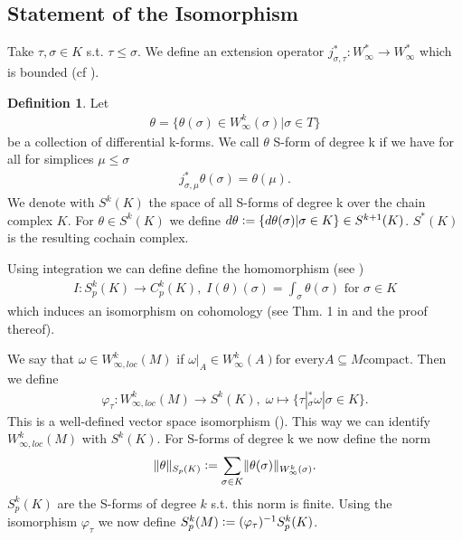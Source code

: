 \documentclass[12pt,a4paper]{article}
\theoremstyle{definition}
\newtheorem{definition}{Definition}
\begin{document}
\subsection{Statement of the Isomorphism}

Take $\tau, \sigma \in K$ s.t. $\tau \leq \sigma$.  We define an extension 
operator $j^*_{\sigma, \tau}:W^*_\infty \rightarrow W^*_\infty $ which is 
bounded (cf \cite[p.191]{goldshtein}). 
\begin{definition}
    Let 
    \begin{align*}
    \theta = \{ \theta(\sigma) \in W^k_\infty(\sigma) | \sigma \in T\}
    \end{align*}
    be a collection of differential k-forms. We call $\theta$ S-form of degree
    k if we have for all for simplices
    $\mu \leq \sigma$ 
    \begin{align*}
    j^*_{\sigma,\mu}\theta(\sigma) = \theta(\mu).
    \end{align*}
    We denote with $S^k(K)$ the space of all S-forms of degree k over the chain
    complex $K$. 
For $\theta \in S^k(K)$ we define $d\theta \vcentcolon= \{ d\theta(\sigma) | 
\sigma \in K \} \in S^{k+1}(K)$. $S^*(K)$ is the resulting cochain complex.
\end{definition}

Using integration we can define define the homomorphism 
(see \cite[p.191]{goldshtein})
\begin{align*}
I: S_p^k(K) \rightarrow C_p^k(K), \; I(\theta)(\sigma) = 
\int_\sigma \theta(\sigma) \text{ for } \sigma \in K
\end{align*}
which induces an isomorphism on cohomology (see Thm. 1 in \cite{goldshtein}
and the proof thereof).

We say that $\omega \in W^k_{\infty,loc}(M)$ 
if $\omega|_A \in W^k_\infty(A) \text{for every} A \subseteq M \text{compact}$.
Then we define 
\begin{align*}
\varphi_\tau: W^k_{\infty,loc}(M) \rightarrow S^k(K), \;
\omega \mapsto \{ \tau|_\sigma^*\omega | \sigma \in K \}.
\end{align*}
This is a well-defined vector space isomorphism (\cite[p.191]{goldshtein}). This
way we can identify $W^k_{\infty,loc}(M)$ with $S^k(K)$. For S-forms of 
degree k we now define the norm
\begin{align*}
\lVert \theta \rVert _{S_p(K)}  \vcentcolon= \sum_{\sigma \in K} 
\lVert \theta(\sigma) \rVert _{W^k_\infty(\sigma)}.
\end{align*} 
$S^k_p(K)$ are the S-forms of degree $k$ s.t. this norm is finite. Using the
isomorphism $\varphi_\tau$ we now define 
$S^k_p(M) \vcentcolon= (\varphi_\tau)^{-1} S^k_p(K)$.
\end{document}
